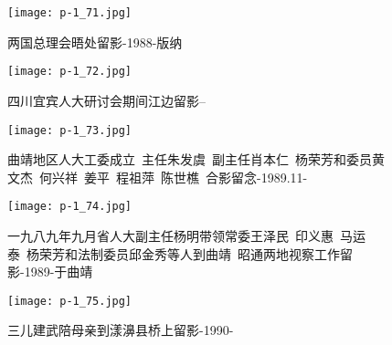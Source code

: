 \clearpage


\begin{figure}
    \begin{center}
        \texttt{[image: p-1\_71.jpg]}
        \begin{shaded}
            \caption{两国总理会晤处留影-1988-版纳}
        \end{shaded}
    \end{center}
\end{figure}

\clearpage


\begin{figure}
    \begin{center}
        \texttt{[image: p-1\_72.jpg]}
        \begin{shaded}
            \caption{四川宜宾人大研讨会期间江边留影--}
        \end{shaded}
    \end{center}
\end{figure}

\clearpage


\begin{figure}
    \begin{center}
        \texttt{[image: p-1\_73.jpg]}
        \begin{shaded}
            \caption{曲靖地区人大工委成立~主任朱发虞~副主任肖本仁~杨荣芳和委员黄文杰~何兴祥~姜平~程祖萍~陈世樵~合影留念-1989.11-}
        \end{shaded}
    \end{center}
\end{figure}

\clearpage


\begin{figure}
    \begin{center}
        \texttt{[image: p-1\_74.jpg]}
        \begin{shaded}
            \caption{一九八九年九月省人大副主任杨明带领常委王泽民~印义惠~马运泰~杨荣芳和法制委员邱金秀等人到曲靖~昭通两地视察工作留影-1989-于曲靖}
        \end{shaded}
    \end{center}
\end{figure}

\clearpage


\begin{figure}
    \begin{center}
        \texttt{[image: p-1\_75.jpg]}
        \begin{shaded}
            \caption{三儿建武陪母亲到漾濞县桥上留影-1990-}
        \end{shaded}
    \end{center}
\end{figure}

